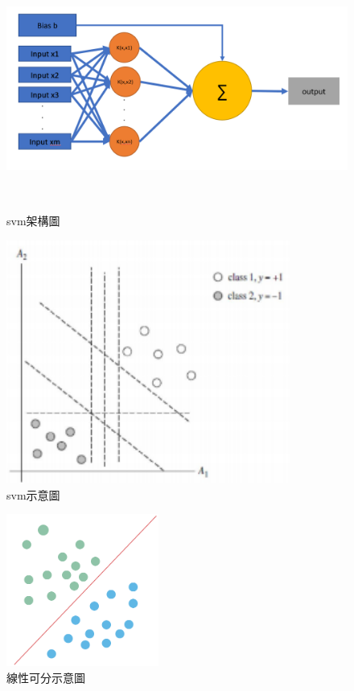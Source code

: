 \begin{figure}[h]
	\centerline{\includegraphics[height=8cm]{pic/SVM ar.PNG}}
	\caption{svm架構圖}
	\label{fig:svmar}
\end{figure}
\begin{figure}[h]
	\centerline{\includegraphics[height=8cm]{pic/SVML.png}}
	\caption{svm示意圖}
	\label{fig:svmar}
\end{figure}
\begin{figure}[H]
	\centerline{\includegraphics[height=5cm]{pic/linear.PNG}}
	\caption{線性可分示意圖}
	\label{fig:Linear}
\end{figure}
